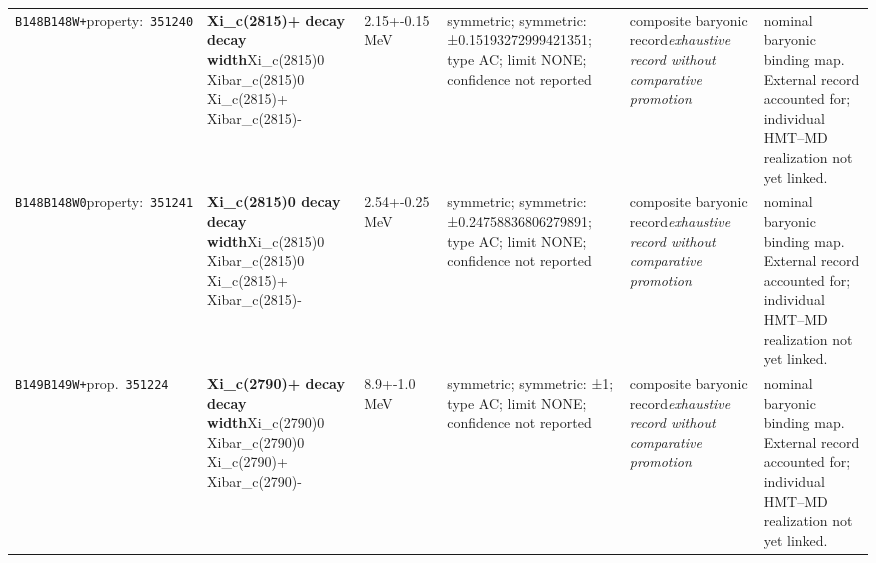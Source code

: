 \begin{landscape}
\begin{longtable}{L{1.85cm}L{4.45cm}L{2.35cm}L{4.05cm}L{3.35cm}L{7.15cm}}
\texttt{B148}\newline \texttt{B148W+}\newline property:\ \texttt{351240} & \textbf{Xi\_\allowbreak{}c(2815)+ decay decay width}\newline Xi\_\allowbreak{}c(2815)0 \textbar{}\allowbreak{} Xibar\_\allowbreak{}c(2815)0 \textbar{}\allowbreak{} Xi\_\allowbreak{}c(2815)+ \textbar{}\allowbreak{} Xibar\_\allowbreak{}c(2815)- & 2.15+-0.15\,MeV & symmetric; symmetric: ±0.15193272999421351; type AC; limit NONE; confidence not reported & composite baryonic record\newline \emph{exhaustive record without comparative promotion} & nominal baryonic binding map. External record accounted for; individual HMT--MD realization not yet linked. \\
\texttt{B148}\newline \texttt{B148W0}\newline property:\ \texttt{351241} & \textbf{Xi\_\allowbreak{}c(2815)0 decay decay width}\newline Xi\_\allowbreak{}c(2815)0 \textbar{}\allowbreak{} Xibar\_\allowbreak{}c(2815)0 \textbar{}\allowbreak{} Xi\_\allowbreak{}c(2815)+ \textbar{}\allowbreak{} Xibar\_\allowbreak{}c(2815)- & 2.54+-0.25\,MeV & symmetric; symmetric: ±0.24758836806279891; type AC; limit NONE; confidence not reported & composite baryonic record\newline \emph{exhaustive record without comparative promotion} & nominal baryonic binding map. External record accounted for; individual HMT--MD realization not yet linked. \\
\texttt{B149}\newline \texttt{B149W+}\newline prop.\ \texttt{351224} & \textbf{Xi\_\allowbreak{}c(2790)+ decay decay width}\newline Xi\_\allowbreak{}c(2790)0 \textbar{}\allowbreak{} Xibar\_\allowbreak{}c(2790)0 \textbar{}\allowbreak{} Xi\_\allowbreak{}c(2790)+ \textbar{}\allowbreak{} Xibar\_\allowbreak{}c(2790)- & 8.9+-1.0\,MeV & symmetric; symmetric: ±1; type AC; limit NONE; confidence not reported & composite baryonic record\newline \emph{exhaustive record without comparative promotion} & nominal baryonic binding map. External record accounted for; individual HMT--MD realization not yet linked. \\

\end{longtable}
\end{landscape}
